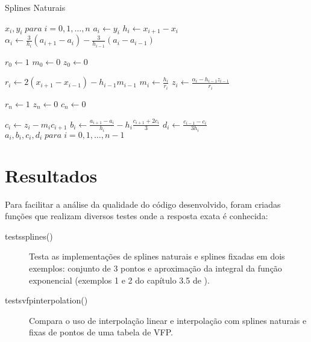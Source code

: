 \documentclass[final,5p]{elsarticle}
\numberwithin{equation}{section}
\begin{document}
        \begin{algorithm}
            \caption{Splines Naturais}\label{alg:splines}
            \begin{algorithmic}
                \Require $x_i,y_i \; para \; i=0,1,\ldots,n$
                    \State $a_i \gets y_i$
                \EndFor
                    \State $h_i \gets x_{i+1} - x_i$
                \EndFor
                    \State $\alpha_i \gets \frac{3}{h_i} (a_{i+1}-a_i) - \frac{3}{h_{i-1}} (a_i-a_{i-1})$
                \EndFor
                
                \State $r_0 \gets 1$
                \State $m_0 \gets 0$
                \State $z_0 \gets 0$
                
                    \State $r_i \gets 2 (x_{i+1} - x_{i-1}) - h_{i-1} m_{i-1}$
                    \State $m_i \gets \frac{h_i}{r_i}$
                    \State $z_i \gets \frac{\alpha_i - h_{i-1} z_{i-1}}{r_i}$
                \EndFor
                
                \State $r_n \gets 1$
                \State $z_n \gets 0$
                \State $c_n \gets 0$
                
                    \State $c_i \gets z_i - m_i c_{i+1}$
                    \State $b_i \gets \frac{a_{i+1} - a_i}{h_i} - h_i \frac{c_{i+1} + 2 c_i}{3}$
                    \State $d_i \gets \frac{c_{i-1} - c_i}{3 h_i}$
                \EndFor
                \State \Return $a_i,b_i,c_i,d_i \; para \; i=0,1,\ldots,n-1$
            \end{algorithmic}
        \end{algorithm}
    
    \section{Resultados}
    
        Para facilitar a análise da qualidade do código desenvolvido, foram criadas funções que realizam diversos testes onde a resposta exata é conhecida:

        \begin{description}
            \item[tests\textunderscore splines()] Testa as implementações de splines naturais e splines fixadas em dois exemplos: conjunto de 3 pontos e aproximação da integral da função exponencial (exemplos 1 e 2 do capítulo 3.5 de \cite{burden2016analise}).
            
            \item[tests\textunderscore vfp\textunderscore interpolation()] Compara o uso de interpolação linear e interpolação com splines naturais e fixas de pontos de uma tabela de VFP.
        \end{description}
\end{document}
